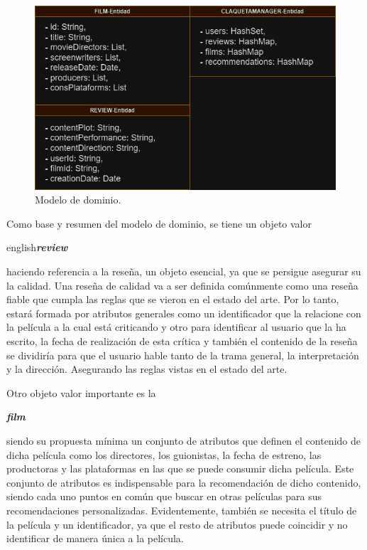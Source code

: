 \begin{figure}[h]
    \centering
    \includegraphics[width=\linewidth]{imagenes/Modelo_Dominio_Claqueta_TFG.drawio.png}
    \caption{Modelo de dominio.}
    \label{fig:diagrama}
\end{figure}



Como base y resumen del modelo de dominio, se tiene un objeto valor \begin{otherlanguage}
{english}\textit{\textbf{review }}\end{otherlanguage}haciendo referencia a la reseña, un objeto
esencial, ya que se persigue asegurar su la calidad. Una reseña de calidad va a ser definida 
comúnmente como una reseña fiable que cumpla las reglas que se vieron en el estado del arte. Por lo tanto, 
estará formada por atributos generales como un identificador que la relacione con la 
película a la cual está criticando y otro para identificar al usuario que la ha escrito, la fecha de 
realización de esta crítica y también el contenido de la reseña se dividiría para que el usuario hable tanto de la 
trama general, la interpretación y la dirección. Asegurando las reglas vistas en el estado del arte.
    
Otro objeto valor importante es la \begin{otherlanguage}{english}\textit{\textbf{film }}\end{otherlanguage}
siendo su propuesta mínima un conjunto de atributos que definen el contenido de dicha película como los 
directores, los guionistas, la fecha de estreno, las productoras y las plataformas en las que se puede 
consumir dicha película. Este conjunto de atributos es indispensable para la recomendación de dicho 
contenido, siendo cada uno puntos en común que buscar en otras películas para sus recomendaciones 
personalizadas. Evidentemente, también se necesita el título de la película y un identificador, ya que el 
resto de atributos puede coincidir y no identificar de manera única a la película.

